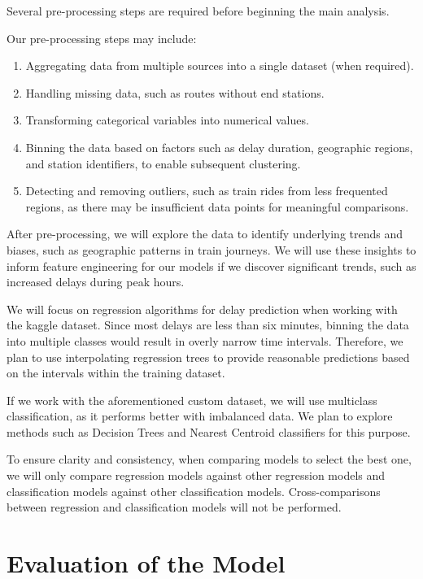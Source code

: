 \documentclass[a4paper,oneside,bibliography=totoc]{scrbook}
\begin{document}
Several pre-processing steps are required before beginning the main analysis.

Our pre-processing steps may include:
\begin{enumerate}
    \item Aggregating data from multiple sources into a single dataset (when required).
    \item Handling missing data, such as routes without end stations.
    \item Transforming categorical variables into numerical values.
    \item Binning the data based on factors such as delay duration, geographic regions, and station identifiers,
    to enable subsequent clustering.
    \item Detecting and removing outliers, such as train rides from less frequented regions,
    as there may be insufficient data points for meaningful comparisons.
\end{enumerate}

After pre-processing, we will explore the data to identify underlying trends and biases,
such as geographic patterns in train journeys.
We will use these insights to inform feature engineering for our models if we discover significant trends,
such as increased delays during peak hours.

We will focus on regression algorithms for delay prediction when working with the kaggle dataset.
Since most delays are less than six minutes, binning the data into multiple classes would result in overly narrow time intervals.
Therefore, we plan to use interpolating regression trees to provide reasonable predictions based on the intervals within the training dataset.

If we work with the aforementioned custom dataset, we will use multiclass classification, as it performs better with imbalanced data. %
We plan to explore methods such as Decision Trees and Nearest Centroid classifiers for this purpose.

To ensure clarity and consistency, when comparing models to select the best one,
we will only compare regression models against other regression models and classification models against other classification models.
Cross-comparisons between regression and classification models will not be performed.

\chapter{Evaluation of the Model}
\label{ch:eval}
\end{document}
